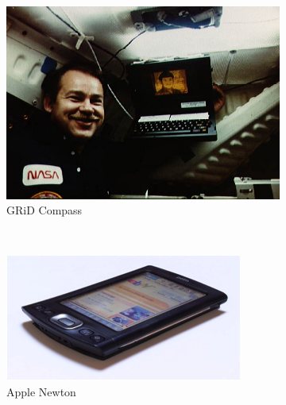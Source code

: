 \documentclass[12pt, a4paper, twoside]{book}
\begin{document}
\begin{figure}[htb]
        \centering
        \begin{subfigure}[b]{0.3\textwidth}
                \includegraphics[width=\textwidth]{images/grid-compass}
                \caption{GRiD Compass}
                \label{fig:grid-compass}
        \end{subfigure}%
        ~ %
        \begin{subfigure}[b]{0.3\textwidth}
                \includegraphics[width=\textwidth]{images/apple-newton}
                \caption{Apple Newton}
                \label{fig:apple-newton}
        \end{subfigure}
        ~ %
        \begin{subfigure}[b]{0.3\textwidth}

\end{subfigure}
\end{figure}
\end{document}
